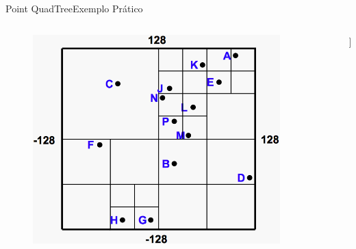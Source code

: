 \documentclass[red, tikz, aspectratio=169, xcolor=dvipsnames]{beamer}
\begin{document}
			\begin{frame}[fragile]{Point QuadTree}{Exemplo Prático}
				\centering
				\vspace{-40px}
				\begin{columns}
					\begin{column}{0.48\textwidth}
						\begin{figure}
							\centering
							\includegraphics[width=0.9\textwidth]{img/pr-quad.png}
						\end{figure}
					\end{column}
					\begin{column}{0.5\textwidth}
						\centering
						\fbox{
							\begin{forest}
								[\texttt{(x,y)}
								[NO]
								[NE]
								[SO]
								[SE]
								]
						\end{forest}}
						
						\begin{forest}
							[x
							[x]
							[\texttt{A}
							]
							[x]
							[\texttt{B}]
							]
						\end{forest}
					\end{column}
				\end{columns}
			\end{frame}
			
\end{document}
